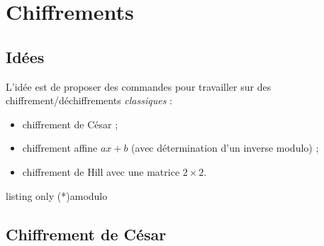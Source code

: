 \begin{PresCodePL}{}
\end{PresCodePL}

\begin{PresCodePL}{}

\end{PresCodePL}

\newpage

\section{Chiffrements}\label{chiffrements}

\subsection{Idées}

\begin{tipblock}
 L'idée est de proposer des commandes pour travailler sur des chiffrement/déchiffrements \textit{classiques} :

\begin{itemize}
	\item chiffrement de César ;
	\item chiffrement affine $ax+b$ (avec détermination d'un inverse modulo) ;
	\item chiffrement de Hill avec une matrice $2\times2$.
\end{itemize}
\vspace*{-\baselineskip}\leavevmode
\end{tipblock}

\begin{PresCodeTexPL}{listing only}
\InverseModulo(*){a}{modulo}



\end{PresCodeTexPL}

\subsection{Chiffrement de César}

\begin{PresCodePL}{}
\end{PresCodePL}

